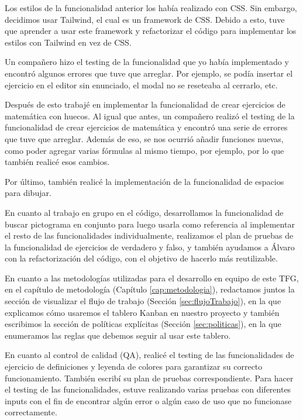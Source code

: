 Los estilos de la funcionalidad anterior los había realizado con CSS. Sin embargo, decidimos usar Tailwind, el cual es un framework de CSS. Debido a esto, tuve que aprender a usar este framework y refactorizar el código para implementar los estilos con Tailwind en vez de CSS.

Un compañero hizo el testing de la funcionalidad que yo había implementado y encontró algunos errores que tuve que arreglar. Por ejemplo, se podía insertar el ejercicio en el editor sin enunciado, el modal no se reseteaba al cerrarlo, etc.

Después de esto trabajé en implementar la funcionalidad de crear ejercicios de matemática con huecos. Al igual que antes, un compañero realizó el testing de la funcionalidad de crear ejercicios de matemática y encontró una serie de errores que tuve que arreglar. Además de eso, se nos ocurrió añadir funciones nuevas, como poder agregar varias fórmulas al mismo tiempo, por ejemplo, por lo que también realicé esos cambios.

Por último, también realicé la implementación de la funcionalidad de espacios para dibujar.

En cuanto al trabajo en grupo en el código, desarrollamos la funcionalidad de buscar pictograma en conjunto para luego usarla como referencia al implementar el resto de las funcionalidades individualmente, realizamos el plan de pruebas de la funcionalidad de ejercicios de verdadero y falso, y también ayudamos a Álvaro con la refactorización del código, con el objetivo de hacerlo más reutilizable.

En cuanto a las metodologías utilizadas para el desarrollo en equipo de este TFG, en el capítulo de metodología (Capítulo \ref{cap:metodologia}), redactamos juntos la sección de visualizar el flujo de trabajo (Sección \ref{sec:flujoTrabajo}), en la que explicamos cómo usaremos el tablero Kanban en nuestro proyecto y también escribimos la sección de políticas explícitas (Sección \ref{sec:politicas}), en la que enumeramos las reglas que debemos seguir al usar este tablero.

En cuanto al control de calidad (QA), realicé el testing de las funcionalidades de ejercicio de definiciones y leyenda de colores para garantizar su correcto funcionamiento. También escribí su plan de pruebas correspondiente. Para hacer el testing de las funcionalidades, estuve realizando varias pruebas con diferentes inputs con el fin de encontrar algún error o algún caso de uso que no funcionase correctamente.

